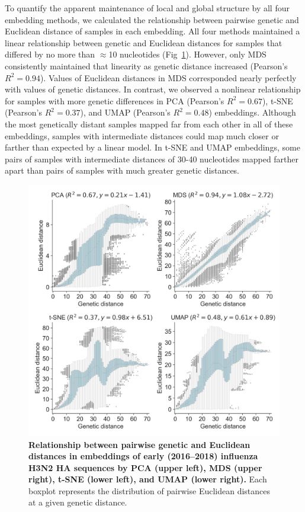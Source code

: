 \documentclass[10pt,letterpaper]{article}
\begin{document}
To quantify the apparent maintenance of local and global structure by all four embedding methods, we calculated the relationship between pairwise genetic and Euclidean distance of samples in each embedding.
All four methods maintained a linear relationship between genetic and Euclidean distances for samples that differed by no more than $\approx$10 nucleotides (Fig~\ref{fig:seasonal-influenza-h3n2-ha-pairwise-distances}).
However, only MDS consistently maintained that linearity as genetic distance increased (Pearson's $R^{2} = 0.94$).
Values of Euclidean distances in MDS corresponded nearly perfectly with values of genetic distances.
In contrast, we observed a nonlinear relationship for samples with more genetic differences in PCA (Pearson's $R^{2} = 0.67$), t-SNE (Pearson's $R^{2} = 0.37$), and UMAP (Pearson's $R^{2} = 0.48$) embeddings.
Although the most genetically distant samples mapped far from each other in all of these embeddings, samples with intermediate distances could map much closer or farther than expected by a linear model.
In t-SNE and UMAP embeddings, some pairs of samples with intermediate distances of 30-40 nucleotides mapped farther apart than pairs of samples with much greater genetic distances.

\begin{figure}[!h]
\includegraphics[width=\columnwidth]{figures/flu-2016-2018-ha-euclidean-distance-by-genetic-distance.png}
\caption{{\bf Relationship between pairwise genetic and Euclidean distances in embeddings of early (2016--2018) influenza H3N2 HA sequences by PCA (upper left), MDS (upper right), t-SNE (lower left), and UMAP (lower right).}
  Each boxplot represents the distribution of pairwise Euclidean distances at a given genetic distance.
}
\label{fig:seasonal-influenza-h3n2-ha-pairwise-distances}
\end{figure}
\end{document}
